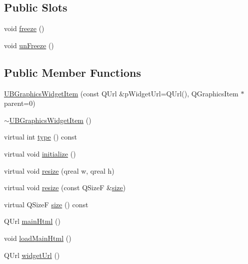 \subsection*{Public Slots}
\begin{DoxyCompactItemize}
\item 
void \hyperlink{class_u_b_graphics_widget_item_a1af419d1aa29398ca4946109953345ed}{freeze} ()
\item 
void \hyperlink{class_u_b_graphics_widget_item_ae597d3bc4717b32af96370541c75855f}{un\-Freeze} ()
\end{DoxyCompactItemize}
\subsection*{Public Member Functions}
\begin{DoxyCompactItemize}
\item 
\hyperlink{class_u_b_graphics_widget_item_ac1a304e8be3f2ece6dd370210f25c90b}{U\-B\-Graphics\-Widget\-Item} (const Q\-Url \&p\-Widget\-Url=Q\-Url(), Q\-Graphics\-Item $\ast$parent=0)
\item 
\hyperlink{class_u_b_graphics_widget_item_ace15f0714eb31bf772861b256ce4c768}{$\sim$\-U\-B\-Graphics\-Widget\-Item} ()
\item 
virtual int \hyperlink{class_u_b_graphics_widget_item_a0dc8048d52fe749e08673a5fbc3fc028}{type} () const 
\item 
virtual void \hyperlink{class_u_b_graphics_widget_item_a49d7af8c415d8448a9cededd97df9a56}{initialize} ()
\item 
virtual void \hyperlink{class_u_b_graphics_widget_item_a7c8b82feec47cdc2232bfab7faa246ac}{resize} (qreal w, qreal h)
\item 
virtual void \hyperlink{class_u_b_graphics_widget_item_a1cb61e609556855a0f7bd7b129b1b64b}{resize} (const Q\-Size\-F \&\hyperlink{class_u_b_graphics_widget_item_a6873a8fd2ce4751e3c08b699791a5f52}{size})
\item 
virtual Q\-Size\-F \hyperlink{class_u_b_graphics_widget_item_a6873a8fd2ce4751e3c08b699791a5f52}{size} () const 
\item 
Q\-Url \hyperlink{class_u_b_graphics_widget_item_a55d8bd17009ad1e73955744866d40fb1}{main\-Html} ()
\item 
void \hyperlink{class_u_b_graphics_widget_item_aadbdbf82a7420d3760df51e7cfdbe1da}{load\-Main\-Html} ()
\item 
Q\-Url \hyperlink{class_u_b_graphics_widget_item_a822163a986fcfb4426e91516444486d5}{widget\-Url} ()
\item 

\end{DoxyCompactItemize}
